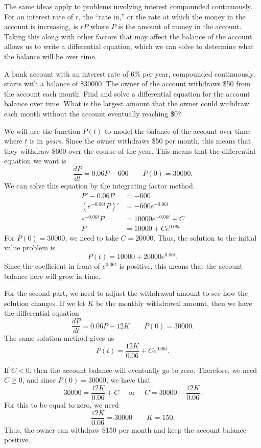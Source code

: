 \documentclass{ximera}
\begin{document}
The same ideas apply to problems involving interest compounded continuously. For an interest rate of $r$, the ``rate in,'' or the rate at which the money in the account is increasing, is $rP$ where $P$ is the amount of money in the account. Taking this along with other factors that may affect the balance of the account allows us to write a differential equation, which we can solve to determine what the balance will be over time.

\begin{example}
    A bank account with an interest rate of $6\%$ per year, compounded continuously, starts with a balance of \$30000. The owner of the account withdraws \$50 from the account each month. Find and solve a differential equation for the account balance over time. What is the largest amount that the owner could withdraw each month without the account eventually reaching \$0?
\end{example}

\begin{exampleSol}
    We will use the function $P(t)$ to model the balance of the account over time, where $t$ is in \emph{years}. Since the owner withdraws \$50 per month, this means that they withdraw \$600 over the course of the year. This means that the differential equation we want is
    \[ 
        \frac{dP}{dt} = 0.06P - 600 \qquad P(0) = 30000. 
    \]
    We can solve this equation by the integrating factor method.
    \[
        \begin{split}
            P' - 0.06P &= -600 \\
            (e^{-0.06t}P)' &= -600e^{-0.06t} \\
            e^{-0.06t}P &= 10000e^{-0.06t} + C \\
            P &= 10000 + Ce^{0.06t}
        \end{split}
    \]
    For $P(0) = 30000$, we need to take $C = 20000$. Thus, the solution to the initial value problem is 
    \[ 
        P(t) = 10000 + 20000e^{0.06 t}. 
    \] 
    Since the coefficient in front of $e^{0.06t}$ is positive, this means that the account balance here will grow in time. 
    
    For the second part, we need to adjust the withdrawal amount to see how the solution changes. If we let $K$ be the monthly withdrawal amount, then we have the differential equation \[ \frac{dP}{dt} = 0.06P - 12K \qquad P(0) = 30000. \] The same solution method gives us
    \[ 
        P(t) = \frac{12K}{0.06} + Ce^{0.06t}. 
    \]
    
    If $C < 0$, then the account balance will eventually go to zero. Therefore, we need $C \geq 0$, and since $P(0) = 30000$, we have that
    \[ 
        30000 = \frac{12K}{0.06} + C \quad \text{ or } \quad C = 30000 - \frac{12K}{0.06}. 
    \] 
    For this to be equal to zero, we need
    \[ 
        \frac{12K}{0.06} = 30000 \qquad K = 150. 
    \] 
    Thus, the owner can withdraw \$150 per month and keep the account balance positive.
\end{exampleSol}
\end{document}
